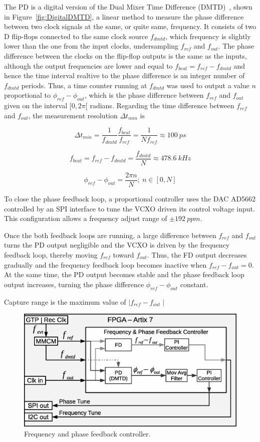 \documentclass[a4paper,
               biblatex,      %
               ]{jacow}
\begin{document}
The PD is a digital version of the Dual Mixer Time Difference (DMTD)~\cite{allan1975picosecond}, shown in Figure~\ref{fig:DigitalDMTD}, a linear method to measure the phase difference between two clock signals at the same, or quite same, frequency. It consists of two D flip-flops connected to the same clock source $f_{dmtd}$, which frequency is slightly lower than the one from the input clocks, undersampling $f_{ref}$ and $f_{out}$. The phase difference between the clocks on the flip-flop outputs is the same as the inputs, although the output frequencies are lower and equal to $f_{beat}=f_{ref}-f_{dmtd}$ and hence the time interval realtive to the phase difference is an integer number of $f_{dmtd}$ periods. Thus, a time counter running at $f_{dmtd}$ was used to output a value $n$ proportional to $\phi_{ref}-\phi_{out}$, which is the phase difference between $f_{ref}$ and $f_{out}$ given on the interval $[0,2\pi[$ radians. Regarding the time difference between $f_{ref}$ and $f_{out}$, the measurement resolution $\Delta t_{min}$ is

\[\Delta t_{min} = \frac{1}{f_{dmtd}}\frac{f_{beat}}{f_{ref}} = \frac{1}{Nf_{ref}} \approx 100~ps\]

\[f_{beat} = f_{ref}-f_{dmtd} = \frac{f_{dmtd}}{N} \approx 478.6~kHz\]

\[\phi_{ref}-\phi_{out} = \frac{2\pi n}{N};~n \in [0,N]\]

To close the phase feedback loop, a proportional controller uses the DAC AD5662 controlled by an SPI interface to tune the VCXO driven its control voltage input. This configuration allows a frequency adjust range of $\pm192~ppm$.

Once the both feedback loops are running, a large difference between $f_{ref}$ and $f_{out}$ turns the PD output negligible and the VCXO is driven by the frequency feedback loop, thereby moving $f_{ref}$ toward $f_{out}$. Thus, the FD output decreases gradually and the frequency feedback loop becomes inactive when $f_{ref}-f_{out}=0$. At the same time, the PD output becomes stable and the phase feedback loop output increases, turning the phase difference $\phi_{ref}-\phi_{out}$ constant. 

Capture range is the maximum value of ${\mid f_{ref}-f_{out} \mid}$


\begin{figure}[!htb]
   \centering
   \includegraphics*[width=0.9\columnwidth]{AFCFPGADMTD}
   \caption{Frequency and phase feedback controller.}
   \label{fig:AFCFPGADMTD}
\end{figure}
\end{document}
